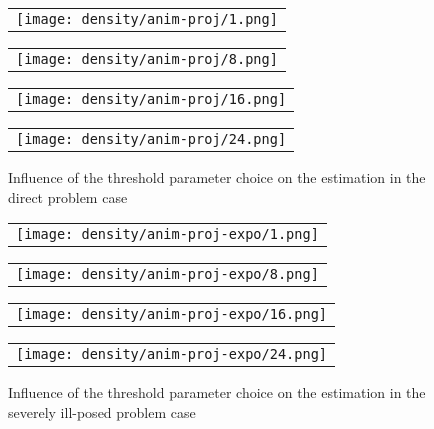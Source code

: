 \begin{figure}
  \centering
  \begin{tabular}{@{}c@{}}
    \texttt{[image: density/anim-proj/1.png]} \\[\abovecaptionskip]
  \end{tabular}
  \begin{tabular}{@{}c@{}}
    \texttt{[image: density/anim-proj/8.png]} \\[\abovecaptionskip]
  \end{tabular}

  \vspace{\floatsep}

  \begin{tabular}{@{}c@{}}
    \texttt{[image: density/anim-proj/16.png]} \\[\abovecaptionskip]
  \end{tabular}
  \begin{tabular}{@{}c@{}}
    \texttt{[image: density/anim-proj/24.png]} \\[\abovecaptionskip]
  \end{tabular}

  \caption{Influence of the threshold parameter choice on the estimation in the direct problem case}\label{circ:proj:direct}
\end{figure}

\begin{figure}
  \centering
  \begin{tabular}{@{}c@{}}
    \texttt{[image: density/anim-proj-expo/1.png]} \\[\abovecaptionskip]
  \end{tabular}
  \begin{tabular}{@{}c@{}}
    \texttt{[image: density/anim-proj-expo/8.png]} \\[\abovecaptionskip]
  \end{tabular}

  \vspace{\floatsep}

  \begin{tabular}{@{}c@{}}
    \texttt{[image: density/anim-proj-expo/16.png]} \\[\abovecaptionskip]
  \end{tabular}
  \begin{tabular}{@{}c@{}}
    \texttt{[image: density/anim-proj-expo/24.png]} \\[\abovecaptionskip]
  \end{tabular}

  \caption{Influence of the threshold parameter choice on the estimation in the severely ill-posed problem case}\label{circ:proj:expo}
\end{figure}

